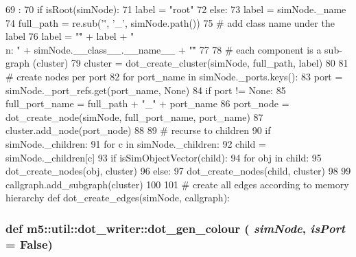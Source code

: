 \begin{DoxyCode}
69                                         :
70     if isRoot(simNode):
71         label = "root"
72     else:
73         label = simNode._name
74     full_path = re.sub('\.', '_', simNode.path())
75     # add class name under the label
76     label = "\"" + label + " \\n: " + simNode.__class__.__name__ + "\""
77 
78     # each component is a sub-graph (cluster)
79     cluster = dot_create_cluster(simNode, full_path, label)
80 
81     # create nodes per port
82     for port_name in simNode._ports.keys():
83         port = simNode._port_refs.get(port_name, None)
84         if port != None:
85             full_port_name = full_path + "_" + port_name
86             port_node = dot_create_node(simNode, full_port_name, port_name)
87             cluster.add_node(port_node)
88 
89     # recurse to children
90     if simNode._children:
91         for c in simNode._children:
92             child = simNode._children[c]
93             if isSimObjectVector(child):
94                 for obj in child:
95                     dot_create_nodes(obj, cluster)
96             else:
97                 dot_create_nodes(child, cluster)
98 
99     callgraph.add_subgraph(cluster)
100 
101 # create all edges according to memory hierarchy
def dot_create_edges(simNode, callgraph):
\end{DoxyCode}
\hypertarget{namespacem5_1_1util_1_1dot__writer_a61d8e0385c2049fd69ddf1bc7b944b7d}{
\subsubsection[{dot\_\-gen\_\-colour}]{\setlength{\rightskip}{0pt plus 5cm}def m5::util::dot\_\-writer::dot\_\-gen\_\-colour ( {\em simNode}, \/   {\em isPort} = {\ttfamily False})}}
\label{namespacem5_1_1util_1_1dot__writer_a61d8e0385c2049fd69ddf1bc7b944b7d}



